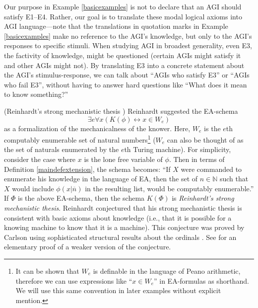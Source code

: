 \documentclass[runningheads]{llncs}
\begin{document}
Our purpose in Example \ref{basicexamples} is not to declare that an
AGI should satisfy E1--E4. Rather, our goal is to translate these
modal logical axioms into AGI language---note that the translations in quotation
marks in Example \ref{basicexamples} make no
reference to the AGI's knowledge, but only to the AGI's responses to
specific stimuli. When studying AGI in broadest generality,
even E3, the factivity of knowledge, might be questioned (certain AGIs might satisfy
it and other AGIs might not). By translating E3 into
a concrete statement about the AGI's stimulus-response,
we can talk about ``AGIs who satisfy E3'' or
``AGIs who fail E3'', without having to answer hard questions
like ``What does it mean to know something?''

\begin{example}
\label{smtexample}
    (Reinhardt's strong mechanistic thesis
    \cite{reinhardt1985absolute} \cite{reinhardt1986epistemic}
    \cite{carlson}) Reinhardt suggested the
    EA-schema
    \[\exists e \forall x ( K(\phi) \leftrightarrow x\in W_e)\]
    as a formalization of the mechanicalness of the knower. Here, $W_e$
    is the $e$th computably enumerable set of natural numbers\footnote{It can be
    shown that $W_e$ is definable in the language of Peano arithmetic, therefore we
    can use expressions like ``$x\in W_e$'' in EA-formulas as shorthand. We will
    use this same convention in later
    examples without explicit mention.} ($W_e$ can also
    be thought of as the set of naturals enumerated by the $e$th Turing machine).
    For simplicity, consider the case where $x$ is the lone free variable
    of $\phi$. Then in terms of Definition \ref{maindefextension}, the schema
    becomes:
    ``If $X$ were commanded to enumerate his knowledge in the language of EA,
    then the set of $n\in\mathbb N$ such that $X$ would include $\phi(x|\overline n)$
    in the resulting list, would be computably enumerable.''
    If $\Phi$ is the above EA-schema, then the schema $K(\Phi)$ is \emph{Reinhardt's
    strong mechanistic thesis}. Reinhardt conjectured that his strong mechanistic
    thesis is consistent with basic axioms about knowledge (i.e., that it is
    possible for a knowing machine to know that it is a machine).
    This conjecture was proved by Carlson \cite{carlson} using sophisticated
    structural results about the ordinals \cite{carlson1999}.
    See \cite{alexander2015fast} for an elementary proof of a weaker
    version of the conjecture.
\end{example}
\end{document}
